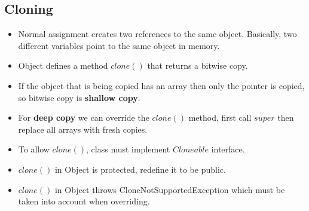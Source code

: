 \documentclass[a4paper]{article}
\begin{document}
\subsection{Cloning}
\begin{itemize}
    \item Normal assignment creates two references to the same object. Basically, two different variables point to the same object in memory.
    \item Object defines a method $clone()$ that returns a bitwise copy.
    \item If the object that is being copied has an array then only the pointer is copied, so bitwise copy is \textbf{shallow copy}.
    \item For \textbf{deep copy} we can override the $clone()$ method, first call $super$ then replace all arrays with fresh copies.
    \item To allow $clone()$, class must implement $Cloneable$ interface.
    \item $clone()$ in Object is protected, redefine it to be public.
    \item $clone()$ in Object throws CloneNotSupportedException which must be taken into account when overriding.
\end{itemize}
\end{document}
